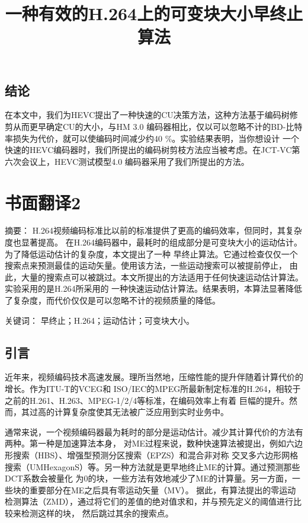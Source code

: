 \section{结论}

在本文中，我们为HEVC提出了一种快速的CU决策方法，这种方法基于编码树修剪从而更早确定CU的大小，与HM 3.0
编码器相比，仅以可以忽略不计的BD-比特率损失为代价，就可以使编码时间减少约40 \%。实验结果表明，当你想设计
一个快速的HEVC编码器时，我们所提出的编码树剪枝方法应当被考虑。在JCT-VC第六次会议上，HEVC测试模型4.0
编码器采用了我们所提出的方法。


\chapter{书面翻译2}

\title{一种有效的H.264上的可变块大小早终止算法}

{\heiti 摘要：} H.264视频编码标准比以前的标准提供了更高的编码效率，但同时，其复杂度也显著提高。
在H.264编码器中，最耗时的组成部分是可变块大小的运动估计。为了降低运动估计的复杂度，本文提出了一种
早终止算法。它通过检查仅仅一个搜索点来预测最佳的运动矢量。使用该方法，一些运动搜索可以被提前停止，
由此，大量的搜索点可以被跳过。本文所提出的方法适用于任何快速运动估计算法。实验采用的是H.264所采用的
一种快速运动估计算法。结果表明，本算法显著降低了复杂度，而代价仅仅是可以忽略不计的视频质量的降低。

{\heiti 关键词：} 早终止；H.264；运动估计；可变块大小。

\section{引言}

近年来，视频编码技术高速发展。理所当然地，压缩性能的提升伴随着计算代价的增长。作为ITU-T的VCEG和
ISO/IEC的MPEG所最新制定标准的H.264，相较于之前的H.261、H.263、MPEG-1/2/4等标准，在编码效率上有着
巨幅的提升。然而，其过高的计算复杂度使其无法被广泛应用到实时业务中。

通常来说，一个视频编码器最为耗时的部分是运动估计。减少其计算代价的方法有两种。第一种是加速算法本身，
对ME过程来说，数种快速算法被提出，例如六边形搜索（HBS）、增强型预测分区搜索（EPZS）和混合非对称
交叉多六边形网格搜索（UMHexagonS）等。另一种方法就是更早地终止ME的计算。通过预测那些DCT系数会被量化
为0的块，一些方法有效地减少了ME的计算量。另一方面，一些块的重要部分在ME之后具有零运动矢量（MV）。
据此，有算法提出的零运动检测算法（ZMD），通过将它们的差值的绝对值求和，并与预先定义的阈值进行比较来检测这样的块，
然后跳过其余的搜索点。

